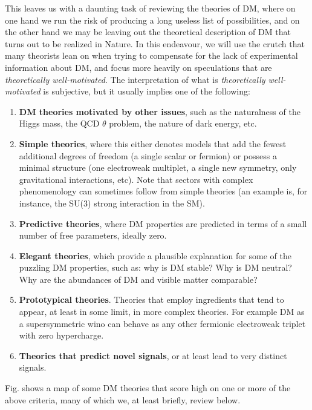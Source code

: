This leaves us with a daunting task of reviewing the theories of DM, where on one hand we run the risk of producing a long useless list of possibilities, and on the other hand we may be leaving out the theoretical description of DM that turns out to be realized in Nature. In this endeavour, we will use the crutch that many theorists lean on when trying to compensate for the lack of experimental information about DM, and focus more heavily on speculations that are {\em theoretically well-motivated}.
The interpretation of what is {\em theoretically well-motivated} is subjective, but it usually implies one of the following:
\begin{enumerate}\label{criteriaDMth}
\item {\bf DM theories motivated by other issues}, such as 
the naturalness of the Higgs mass, the QCD $\theta$ problem,
the nature of dark energy, etc. 

\item {\bf Simple theories}, where this either denotes 
models that add the fewest additional degrees of freedom (a single scalar or fermion) or possess a minimal structure (one electroweak multiplet, a single new symmetry, only gravitational interactions, etc).
Note that sectors with complex phenomenology can sometimes follow from simple theories (an example is, for instance, the SU(3) strong interaction in the SM).

\item {\bf Predictive theories}, where DM properties are predicted in terms of 
a small number of free parameters, ideally zero.

\item {\bf Elegant theories},  which provide a plausible explanation for some of the
puzzling DM properties, such as: why is DM stable? Why is DM neutral? Why are the abundances of DM and visible matter comparable? 

\item {\bf Prototypical theories}.
Theories that employ ingredients that tend to appear, at least in some limit, in more complex theories.
For example DM as a supersymmetric wino can behave as any other fermionic electroweak triplet with zero hypercharge.

\item {\bf Theories that predict novel signals}, or at least lead to very distinct signals.  \label{DMTsignals}
\end{enumerate}
Fig. shows a map of some DM theories that score high on one or more of the above criteria, many of which we, at least briefly, review below. 



